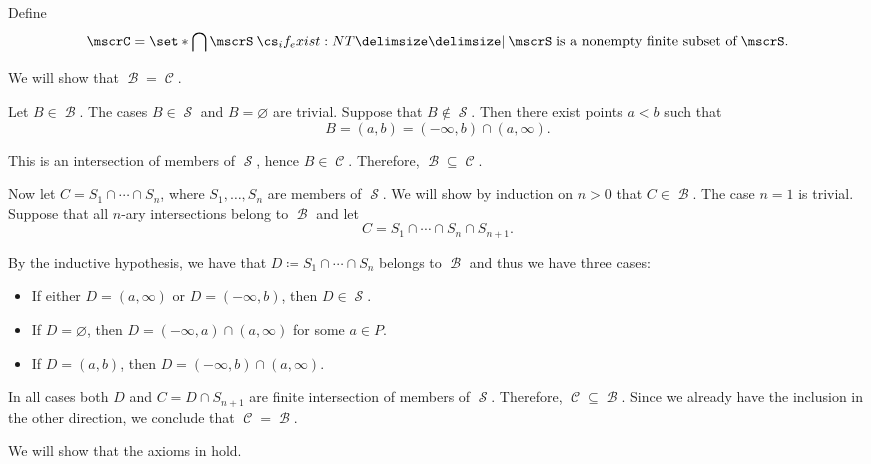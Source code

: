 \begin{defproof}
   Define
  \begin{equation*}
    \mscrC = \set*{ \bigcap \mscrS \given* \mscrS \T{is a nonempty finite subset of} \mscrS }.
  \end{equation*}

  We will show that \( \mscrB = \mscrC \).

  Let \( B \in \mscrB \). The cases \( B \in \mscrS \) and \( B = \varnothing \) are trivial. Suppose that \( B \not\in \mscrS \). Then there exist points \( a < b \) such that
  \begin{equation*}
    B = (a, b) = (-\infty, b) \cap (a, \infty).
  \end{equation*}

  This is an intersection of members of \( \mscrS \), hence \( B \in \mscrC \). Therefore, \( \mscrB \subseteq \mscrC \).

  Now let \( C = S_1 \cap \cdots \cap S_n \), where \( S_1, \ldots, S_n \) are members of \( \mscrS \). We will show by induction on \( n > 0 \) that \( C \in \mscrB \). The case \( n = 1 \) is trivial. Suppose that all \( n \)-ary intersections belong to \( \mscrB \) and let
  \begin{equation*}
    C = S_1 \cap \cdots \cap S_n \cap S_{n+1}.
  \end{equation*}

  By the inductive hypothesis, we have that \( D \coloneqq S_1 \cap \cdots \cap S_n \) belongs to \( \mscrB \) and thus we have three cases:
  \begin{itemize}
    \item If either \( D = (a, \infty) \) or \( D = (-\infty, b) \), then \( D \in \mscrS \).
    \item If \( D = \varnothing \), then \( D = (-\infty, a) \cap (a, \infty) \) for some \( a \in P \).
    \item If \( D = (a, b) \), then \( D = (-\infty, b) \cap (a, \infty) \).
  \end{itemize}

  In all cases both \( D \) and \( C = D \cap S_{n+1} \) are finite intersection of members of \( \mscrS \). Therefore, \( \mscrC \subseteq \mscrB \). Since we already have the inclusion in the other direction, we conclude that \( \mscrC = \mscrB \).

   We will show that the axioms in  hold.


\end{defproof}

